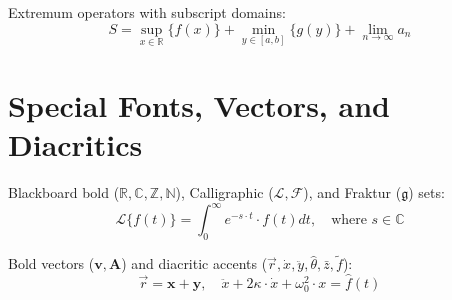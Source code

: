 \documentclass{article}
\begin{document}
Extremum operators with subscript domains:
\begin{equation}
S = \sup_{x \in \mathbb{R}}{\{ f(x) \}} + \min_{y \in [a, b]}{\{ g(y) \}} + \lim_{n \to \infty}{a_{n}}
\end{equation}

\section{Special Fonts, Vectors, and Diacritics}
Blackboard bold ($\mathbb{R}, \mathbb{C}, \mathbb{Z}, \mathbb{N}$), Calligraphic ($\mathcal{L}, \mathcal{F}$), and Fraktur ($\mathfrak{g}$) sets:
\begin{equation}
\mathcal{L}\{ f(t) \} = \int_{0}^{\infty}{e^{-s \cdot t} \cdot f(t) dt}, \quad \text{where } s \in \mathbb{C}
\end{equation}

Bold vectors ($\mathbf{v}, \bm{A}$) and diacritic accents ($\vec{r}, \dot{x}, \ddot{y}, \hat{\theta}, \bar{z}, \tilde{f}$):
\begin{equation}
\vec{r} = \mathbf{x} + \mathbf{y}, \quad \ddot{x} + 2\kappa \cdot \dot{x} + \omega_{0}^{2} \cdot x = \hat{f}(t)
\end{equation}
\end{document}
